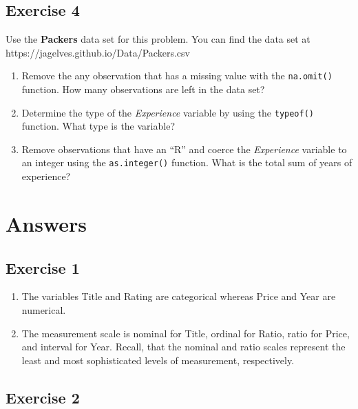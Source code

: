 \documentclass[
  letterpaper,
  DIV=11,
  numbers=noendperiod]{scrreprt}
\begin{document}
\hypertarget{exercise-4}{%
\subsection*{Exercise 4}\label{exercise-4}}

Use the \textbf{Packers} data set for this problem. You can find the
data set at https://jagelves.github.io/Data/Packers.csv

\begin{enumerate}
\def\labelenumi{\arabic{enumi}.}
\item
  Remove the any observation that has a missing value with the
  \texttt{na.omit()} function. How many observations are left in the
  data set?
\item
  Determine the type of the \emph{Experience} variable by using the
  \texttt{typeof()} function. What type is the variable?
\item
  Remove observations that have an ``R'' and coerce the
  \emph{Experience} variable to an integer using the
  \texttt{as.integer()} function. What is the total sum of years of
  experience?
\end{enumerate}

\hypertarget{answers}{%
\section{Answers}\label{answers}}

\hypertarget{exercise-1-1}{%
\subsection*{Exercise 1}\label{exercise-1-1}}

\begin{enumerate}
\def\labelenumi{\arabic{enumi}.}
\item
  The variables Title and Rating are categorical whereas Price and Year
  are numerical.
\item
  The measurement scale is nominal for Title, ordinal for Ratio, ratio
  for Price, and interval for Year. Recall, that the nominal and ratio
  scales represent the least and most sophisticated levels of
  measurement, respectively.
\end{enumerate}

\hypertarget{exercise-2-1}{%
\subsection*{Exercise 2}\label{exercise-2-1}}
\end{document}
